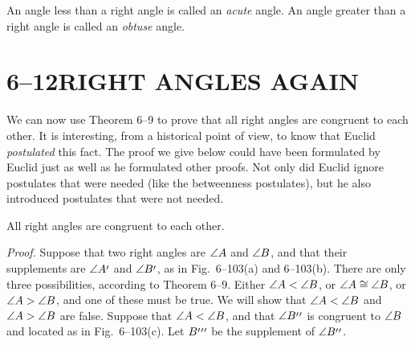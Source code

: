 \documentclass[11pt]{book}
\begin{document}
\begin{definition}
An angle less than a right angle is called an \emph{acute} angle. An angle
greater than a right angle is called an \emph{obtuse} angle.
\end{definition}

\section*{6--12\quad RIGHT ANGLES AGAIN}

We can now use Theorem 6--9 to prove that all right angles are congruent to
each other. It is interesting, from a historical point of view, to know that
Euclid \emph{postulated} this fact. The proof we give below could have been
formulated by Euclid just as well as he formulated other proofs. Not only did
Euclid ignore postulates that were needed (like the betweenness postulates),
but he also introduced postulates that were not needed.

\begin{theorem}
All right angles are congruent to each other.
\end{theorem}

\emph{Proof.} Suppose that two right angles are $\angle A$ and $\angle B$, and
that their supplements are $\ang{A\VIpr}$ and $\ang{B\VIpr}$, as in
Fig.~6--103(a) and 6--103(b). There are only three possibilities, according to
Theorem 6--9. Either $\angle A < \angle B$, or $\angle A \cong \angle B$, or
$\angle A > \angle B$, and one of these must be true. We will show that $\angle A
< \angle B$ and $\angle A > \angle B$ are false. Suppose that $\angle A < \angle B$,
and that $\ang{B\VIppr}$ is congruent to $\angle B$ and located as in
Fig.~6--103(c). Let $B\VIpppr$ be the supplement of $\ang{B\VIppr}$.

\FIGVIONEHUNDREDTHREE

\begin{steps}
\end{steps}
\end{document}
